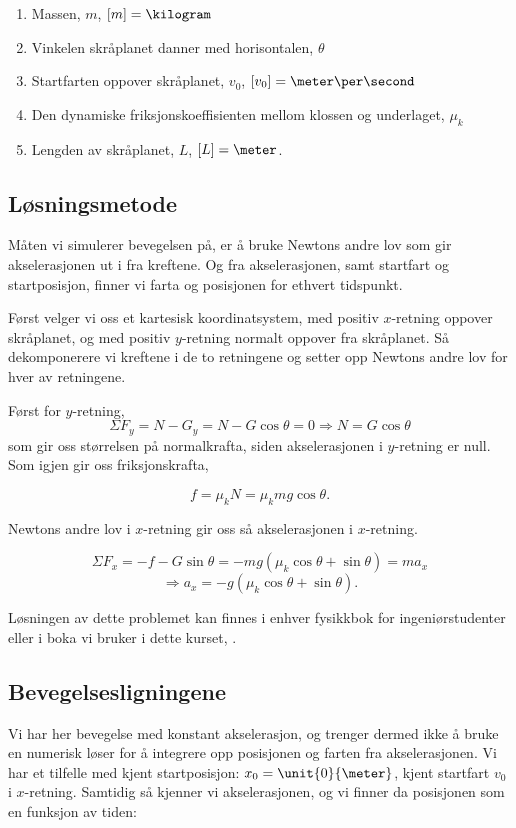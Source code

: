 \documentclass[letterpaper,12pt]{article}
\begin{document}
\begin{enumerate}
\item Massen, $m$, $[m]=\kilogram$
\item Vinkelen skråplanet danner med horisontalen, $\theta$
\item Startfarten oppover skråplanet, $v_0$, $[v_0]=\meter\per\second$
\item Den dynamiske friksjonskoeffisienten mellom klossen og underlaget, $\mu_k$
\item Lengden av skråplanet, $L$, $[L]=\meter$.
\end{enumerate}



\subsection{Løsningsmetode}
Måten vi simulerer bevegelsen på, er å bruke Newtons andre lov som gir akselerasjonen ut i fra kreftene. Og fra akselerasjonen, samt startfart og startposisjon, finner vi farta og posisjonen for ethvert tidspunkt. 

Først velger vi oss et kartesisk koordinatsystem, med positiv $x$-retning oppover skråplanet, og med positiv $y$-retning normalt oppover fra skråplanet.
Så dekomponerere vi kreftene i de to retningene og setter opp Newtons andre lov for hver av retningene.

Først for $y$-retning, 
\begin{equation}
\Sigma F_y = N-G_y = N - G\cos\theta= 0 \Rightarrow N=G\cos\theta
\end{equation}
som gir oss størrelsen på normalkrafta, siden akselerasjonen i $y$-retning er null. Som igjen gir oss friksjonskrafta,

\begin{equation}
f = \mu_k N = \mu_k mg\cos\theta.
\end{equation}

Newtons andre lov i $x$-retning gir oss så akselerasjonen i $x$-retning. 

\[
\Sigma F_x = -f -G\sin\theta = - mg( \mu_k \cos\theta +\sin\theta) = m a_x 
\]
\begin{equation}
\Rightarrow a_x = - g( \mu_k \cos\theta + \sin\theta).
\end{equation}

Løsningen av dette problemet kan finnes i enhver fysikkbok for ingeniørstudenter eller i boka vi bruker i dette kurset, \cite{book}.

\subsection{Bevegelsesligningene}
Vi har her bevegelse med konstant akselerasjon, og trenger dermed ikke å bruke en numerisk løser for å integrere opp posisjonen og farten fra akselerasjonen. Vi har et tilfelle med kjent startposisjon: $x_0=\unit{0}{\meter}$, kjent startfart $v_0$ i $x$-retning. Samtidig så kjenner vi akselerasjonen, og vi finner da posisjonen som en funksjon av tiden:
\end{document}

